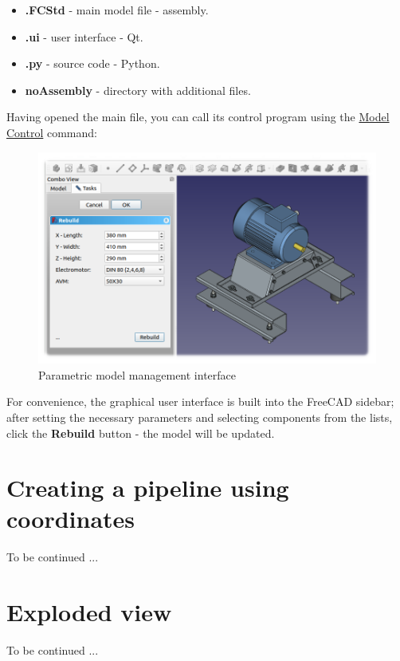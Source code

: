 \documentclass[a4paper,12pt]{article}
\begin{document}
\begin{itemize}
	\item \textbf{.FCStd} - main model file - assembly.
	\item \textbf{.ui} - user interface - Qt.
	\item \textbf{.py} - source code - Python.
	\item \textbf{noAssembly} - directory with additional files.
\end{itemize}

\pagebreak

Having opened the main file, you can call its control program using the \hyperref[sec:3]{Model Control} command:

\begin{figure}[htp]
\centering
\includegraphics[width=1.0\textwidth]{img/example_mc.png}
\caption{Parametric model management interface}
\label{sec:example_mc}
\end{figure}

For convenience, the graphical user interface is built into the FreeCAD sidebar; after setting the necessary parameters and selecting components from the lists, click the \textbf{Rebuild} button - the model will be updated.

\pagebreak



\section{Creating a pipeline using coordinates}

To be continued ...



\section{Exploded view}

To be continued ...

\end{document}
